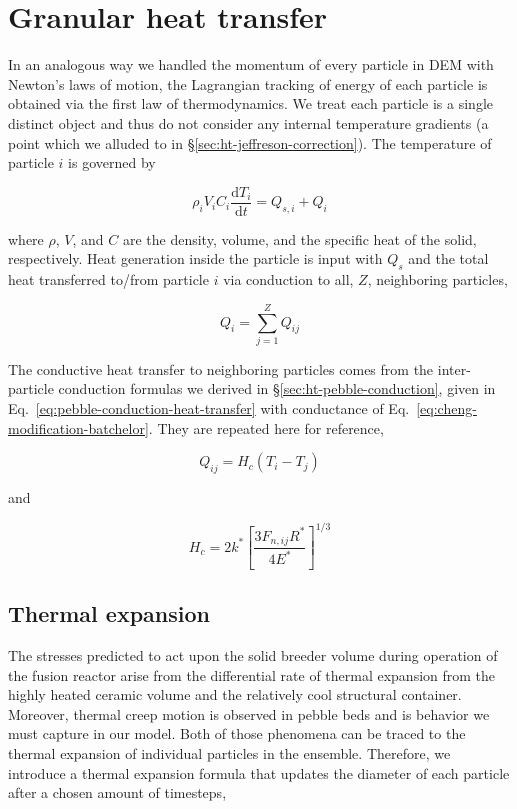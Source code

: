 \section{Granular heat transfer}\label{sec:dem-heat-transfer}

In an analogous way we handled the momentum of every particle in DEM with Newton's laws of motion, the Lagrangian tracking of energy of each particle is obtained via the first law of thermodynamics. We treat each particle is a single distinct object and thus do not consider any internal temperature gradients (a point which we alluded to in \S\ref{sec:ht-jeffreson-correction}). The temperature of particle $i$ is governed by

\begin{equation}\label{eq:thermoFirstLaw}
	\rho_iV_iC_i\frac{\mathrm{d}T_i}{\mathrm{d}t} = Q_{s,i} + Q_{i}
\end{equation}

where $\rho$, $V$, and $C$ are the density, volume, and the specific heat of the solid, respectively. Heat generation inside the particle is input with $Q_{s}$ and the total heat transferred to/from particle $i$ via conduction to all, $Z$, neighboring particles,

\begin{equation}
	Q_i = \sum_{j=1}^Z Q_{ij}
\end{equation}

The conductive heat transfer to neighboring particles comes from the inter-particle conduction formulas we derived in \S\ref{sec:ht-pebble-conduction}, given in Eq.~\ref{eq:pebble-conduction-heat-transfer} with conductance of Eq.~\ref{eq:cheng-modification-batchelor}. They are repeated here for reference,

\begin{equation*}
	Q_{ij} = H_c(T_i - T_j)
\end{equation*} 

and

\begin{equation*}
	H_c= 2k^*\left[\frac{3F_{n,ij}R^*}{4E^*}\right]^{1/3}
\end{equation*}

\subsection{Thermal expansion}
The stresses predicted to act upon the solid breeder volume during operation of the fusion reactor arise from the differential rate of thermal expansion from the highly heated ceramic volume and the relatively cool structural container. Moreover, thermal creep motion is observed in pebble beds\cite{Tanigawa:2010cr, Vargas2007, Chen2009, Divoux2008} and is behavior we must capture in our model. Both of those phenomena can be traced to the thermal expansion of individual particles in the ensemble. Therefore, we introduce a thermal expansion formula that updates the diameter of each particle after a chosen amount of timesteps,

